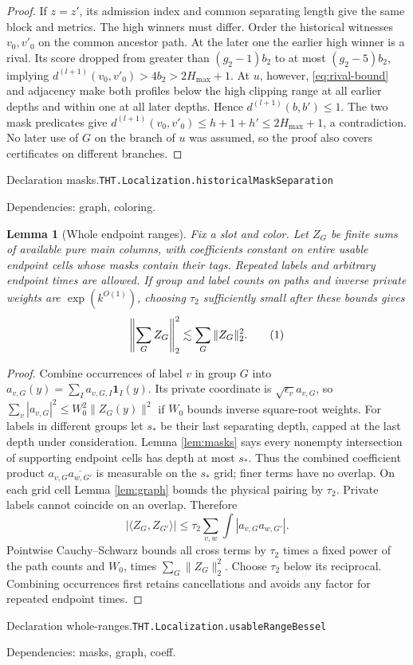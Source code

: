 \documentclass[11pt]{article}
\newtheorem{lemma}[theorem]{Lemma}
\theoremstyle{definition}
\newcommand{\one}{\mathbf 1}
\newcommand{\eqtag}[1]{\refstepcounter{equation}\tag{\theequation}\label{#1}}
\numberwithin{equation}{section}
\newcommand{\bp}[3]{\par\smallskip\begingroup\footnotesize
\noindent\hypertarget{bp:#1}{\textsf{Declaration #1.}}\quad\nolinkurl{#2}\par
\noindent\textsf{Dependencies:} #3.\par\endgroup\smallskip}
\begin{document}
\begin{proof}
If $z=z'$, its admission index and common separating length give the same block and metrics. The high winners must differ. Order the historical witnesses $v_0,v'_0$ on the common ancestor path. At the later one the earlier high winner is a rival. Its score dropped from greater than $(g_2-1)b_2$ to at most $(g_2-5)b_2$, implying $d^{(l+1)}(v_0,v'_0)>4b_2>2H_{\max}+1$. At $u$, however, \eqref{eq:rival-bound} and adjacency make both profiles below the high clipping range at all earlier depths and within one at all later depths. Hence $d^{(l+1)}(b,b')\le1$. The two mask predicates give $d^{(l+1)}(v_0,v'_0)\le h+1+h'\le2H_{\max}+1$, a contradiction. No later use of $G$ on the branch of $u$ was assumed, so the proof also covers certificates on different branches.
\end{proof}
\bp{masks}{THT.Localization.historicalMaskSeparation}{graph, coloring}


\begin{lemma}[Whole endpoint ranges]\label{lem:whole-ranges}
Fix a slot and color. Let $Z_G$ be finite sums of available pure main columns, with coefficients constant on entire usable endpoint cells whose masks contain their tags. Repeated labels and arbitrary endpoint times are allowed. If group and label counts on paths and inverse private weights are $\exp(k^{O(1)})$, choosing $\tau_2$ sufficiently small after these bounds gives
\[
 \left\|\sum_G Z_G\right\|_2^2\lesssim\sum_G\|Z_G\|_2^2.
 \eqtag{eq:whole-ranges}
\]
\end{lemma}
\begin{proof}
Combine occurrences of label $v$ in group $G$ into $a_{v,G}(y)=\sum_Ia_{v,G,I}\one_I(y)$. Its private coordinate is $\sqrt{\epsilon_v}a_{v,G}$, so $\sum_v|a_{v,G}|^2\le W_0^2\|Z_G(y)\|^2$ if $W_0$ bounds inverse square-root weights. For labels in different groups let $s_*$ be their last separating depth, capped at the last depth under consideration. Lemma \ref{lem:masks} says every nonempty intersection of supporting endpoint cells has depth at most $s_*$. Thus the combined coefficient product $a_{v,G}\overline{a_{w,G'}}$ is measurable on the $s_*$ grid; finer terms have no overlap. On each grid cell Lemma \ref{lem:graph} bounds the physical pairing by $\tau_2$. Private labels cannot coincide on an overlap. Therefore
\[
 |\langle Z_G,Z_{G'}\rangle|\le\tau_2\sum_{v,w}\int|a_{v,G}a_{w,G'}|.
\]
Pointwise Cauchy--Schwarz bounds all cross terms by $\tau_2$ times a fixed power of the path counts and $W_0$, times $\sum_G\|Z_G\|_2^2$. Choose $\tau_2$ below its reciprocal. Combining occurrences first retains cancellations and avoids any factor for repeated endpoint times.
\end{proof}
\bp{whole-ranges}{THT.Localization.usableRangeBessel}{masks, graph, coeff}
\end{document}
